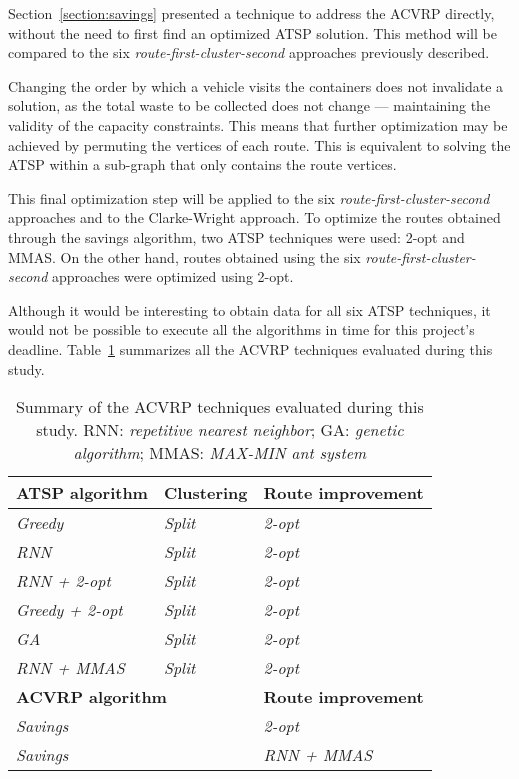 Section~\ref{section:savings} presented a technique to address the ACVRP
directly, without the need to first find an optimized ATSP solution. This method
will be compared to the six \textit{route-first-cluster-second} approaches
previously described.

Changing the order by which a vehicle visits the containers does not invalidate
a solution, as the total waste to be collected does not change --- maintaining
the validity of the capacity constraints. This means that further optimization
may be achieved by permuting the vertices of each route. This is equivalent to
solving the ATSP within a sub-graph that only contains the route vertices.

This final optimization step will be applied to the six
\textit{route-first-cluster-second} approaches and to the Clarke-Wright
approach. To optimize the routes obtained through the savings algorithm, two
ATSP techniques were used: 2-opt and MMAS. On the other hand, routes obtained
using the six \textit{route-first-cluster-second} approaches were optimized
using 2-opt.

Although it would be interesting to obtain data for all six ATSP techniques, it
would not be possible to execute all the algorithms in time for this project's
deadline. Table~\ref{table:approach} summarizes all the ACVRP techniques
evaluated during this study.

\begin{table}[h!]
  \caption{Summary of the ACVRP techniques evaluated during this study. RNN:
  \textit{repetitive nearest neighbor}; GA: \textit{genetic algorithm}; MMAS:
  \textit{MAX-MIN ant system}}
  \begin{center}
    \begin{tabular}{lll}
      \hline
      \textbf{ATSP algorithm} & \textbf{Clustering} & \textbf{Route improvement} \\
      \hline
      \textit{Greedy} & \textit{Split} & \textit{2-opt} \\
      \textit{RNN} & \textit{Split} & \textit{2-opt} \\
      \textit{RNN + 2-opt} & \textit{Split} & \textit{2-opt} \\
      \textit{Greedy + 2-opt} & \textit{Split} & \textit{2-opt} \\
      \textit{GA} & \textit{Split} & \textit{2-opt} \\
      \textit{RNN + MMAS} & \textit{Split} & \textit{2-opt} \\
      \hline
      \multicolumn{2}{l}{\textbf{ACVRP algorithm}} & \textbf{Route improvement} \\
      \hline
      \multicolumn{2}{l}{\textit{Savings}} & \textit{2-opt} \\
      \multicolumn{2}{l}{\textit{Savings}} & \textit{RNN + MMAS} \\
      \hline
    \end{tabular}
  \end{center}
  \label{table:approach}
\end{table}




